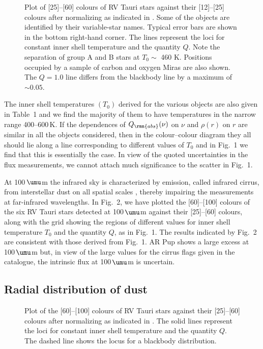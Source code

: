 \documentclass[useAMS,usedcolumn,usegraphicx,usenatbib]{mn2e}
\begin{document}
\begin{figure}
 \vspace{302pt}
 \caption{Plot of [25]--[60] colours of RV  Tauri stars against their
  [12]--[25] colours after  normalizing as indicated in \citet{b3}.
  Some of the objects are identified by their variable-star
  names. Typical error bars are shown in the bottom right-hand corner.
  The lines represent the loci for constant inner shell temperature and
  the quantity $Q$. Note the separation of group A and B stars at $T_0
  \sim$ 460$\,$\,K. Positions occupied by a sample of carbon and oxygen
  Miras are also shown. The $Q=1.0$ line differs from the blackbody line
  by a maximum of $\sim 0.05$.}
\end{figure}
The inner shell temperatures $(T_0)$ derived for the various objects
are also given in Table~1 and we find the majority of them to have
temperatures in the narrow range 400--600$\,$K. If the dependences of
$Q_{\rmn{abs}}(\nu)$ on $\nu$ and $\rho(r)$ on $r$ are similar in all
the objects considered, then in the colour--colour diagram they all
should lie along a line corresponding to different values of $T_0$ and
in Fig.~1 we find that this is essentially the  case. In view of the
quoted uncertainties in the flux measurements, we cannot attach much
significance to the scatter in Fig.~1.

At \hbox{100\,$\umu$m} the infrared sky is characterized by
emission, called infrared cirrus, from interstellar dust on all
spatial scales \citep{b16}, thereby impairing the measurements at
far-infrared wavelengths. In Fig.~2, we have plotted the
[60]--[100] colours of the six RV Tauri stars detected at
\hbox{100\,$\umu$m} against their [25]--[60] colours, along with
the grid showing the regions of different values for inner shell
temperature $T_0$ and the quantity $Q$, as in Fig.~1. The results
indicated by Fig.~2 are consistent with those derived from Fig.~1.
AR Pup shows a large excess at \hbox{100\,$\umu$m} but, in view of
the large values for the cirrus flags given in the catalogue, the
intrinsic flux at \hbox{100\,$\umu$m} is uncertain.

\subsection{Radial distribution of dust}

\begin{figure*}
  \vspace*{174pt}
  \caption{Plot of the [60]--[100] colours of RV Tauri stars against
  their [25]--[60] colours after normalizing as indicated in \citet{b3}.
  The solid lines represent the loci for constant
  inner shell temperature and the quantity $Q$. The dashed line shows
  the locus for a blackbody distribution.}
\end{figure*}
\end{document}
